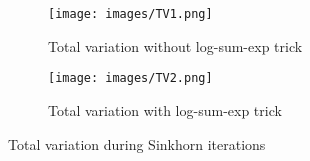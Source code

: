 \documentclass[a4paper,11pt]{article}
\newcommand{\1}{\mathbbm{1}}
\begin{document}
\begin{figure}[H]
    \centering
    \begin{subfigure}{0.4\linewidth}
        \centering
        \texttt{[image: images/TV1.png]}
        \caption{Total variation without log-sum-exp trick}
        \label{fig:TV1}
    \end{subfigure}
    \hfill
    \begin{subfigure}{0.4\linewidth}
        \centering
        \texttt{[image: images/TV2.png]}
        \caption{Total variation with log-sum-exp trick}
        \label{fig:TV2}
    \end{subfigure}
    \caption{Total variation during Sinkhorn iterations}
    \label{fig:TV}
\end{figure}
\end{document}
